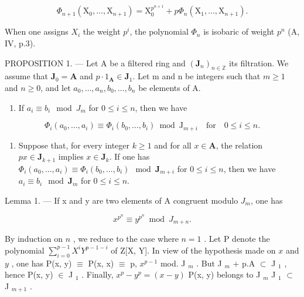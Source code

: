 \[
\Phi_ {n + 1} \left(\mathrm{X} _ {0}, \dots , \mathrm{X} _ {n + 1}\right) = \mathrm{X} _ {0} ^ {p ^ {n + 1}} + p \Phi_ {n} \left(\mathrm{X} _ {1}, \dots , \mathrm{X} _ {n + 1}\right).
\]

When one assigns \(X_{i}\) the weight \(p^{i}\), the polynomial \(\Phi_{n}\) is isobaric of weight \(p^{n}\) (A, IV, p.3).

PROPOSITION 1. --- Let A be a filtered ring and \((\mathbf{J}_n)_{n\in \mathbb{Z}}\) its filtration. We assume that \(\mathbf{J}_0 = \mathbf{A}\) and \(p\cdot 1_{\mathbf{A}}\in \mathbf{J}_{1}\). Let m and n be integers such that \(m\geqslant 1\) and \(n\geqslant 0\), and let \(a_0,\dots,a_n,b_0,\dots,b_n\) be elements of A.

\begin{enumerate}
\def\labelenumi{\alph{enumi})}
\tightlist
\item
  If \(a_i \equiv b_i \mod J_m\) for \(0 \leqslant i \leqslant n\), then we have
\end{enumerate}

\[
\Phi_ {i} (a _ {0}, \dots , a _ {i}) \equiv \Phi_ {i} (b _ {0}, \dots , b _ {i}) \bmod \mathrm{J} _ {m + i} \quad \text{for} \quad 0 \leqslant i \leqslant n.
\]

\begin{enumerate}
\def\labelenumi{\alph{enumi})}
\setcounter{enumi}{1}
\tightlist
\item
  Suppose that, for every integer \(k \geqslant 1\) and for all \(x \in \mathbf{A}\), the relation \(p x \in \mathbf{J}_{k+1}\) implies \(x \in \mathbf{J}_k\). If one has \(\Phi_i(a_0, ..., a_i) \equiv \Phi_i(b_0, ..., b_i) \mod \mathbf{J}_{m+i}\) for \(0 \leqslant i \leqslant n\), then we have \(a_i \equiv b_i \mod \mathbf{J}_m\) for \(0 \leqslant i \leqslant n\).
\end{enumerate}

Lemma 1. --- If x and y are two elements of A congruent modulo \(J_{m}\), one has

\[
x ^ {p ^ {n}} \equiv y ^ {p ^ {n}} \bmod J _ {m + n}.
\]

By induction on \(n\) , we reduce to the case where \(n=1\) . Let P denote the polynomial \(\sum_{i=0}^{p-1} X^i Y^{p-1-i}\) of Z{[}X, Y{]}. In view of the hypothesis made on \(x\) and \(y\) , one has P(x, y) \(\equiv\) P(x, x) \(\equiv\) p, \(x^{p-1}\) mod. J \(_m\) . But J \(_m\) + p.A \(\subset\) J \(_1\) , hence P(x, y) \(\in\) J \(_1\) . Finally, \(x^p - y^p = (x - y)\) P(x, y) belongs to J \(_m\) J \(_1\) \(\subset\) J \(_{m+1}\) .

